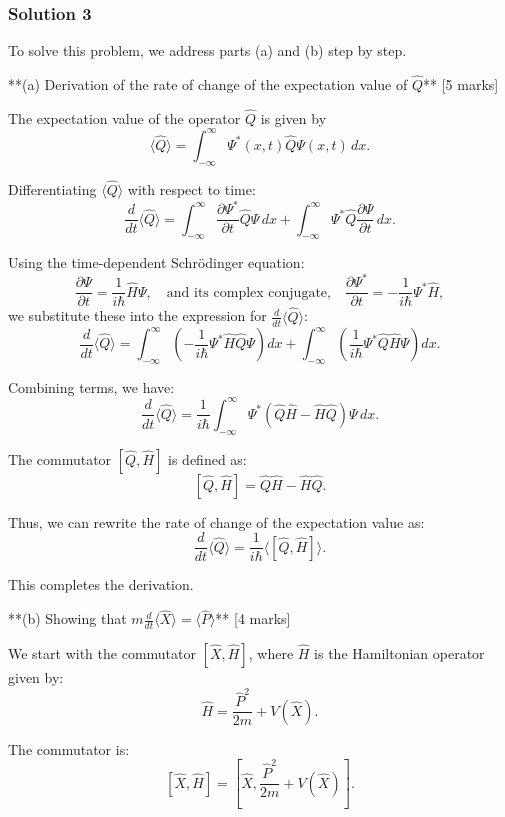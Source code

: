 \documentclass{article}
\begin{document}
\subsubsection{Solution 3}
To solve this problem, we address parts (a) and (b) step by step.

**(a) Derivation of the rate of change of the expectation value of $\hat{Q}$** [5 marks]  

The expectation value of the operator $\hat{Q}$ is given by  
\[
\langle \hat{Q} \rangle = \int_{-\infty}^\infty \Psi^*(x, t) \hat{Q} \Psi(x, t) \, dx.
\]  

Differentiating $\langle \hat{Q} \rangle$ with respect to time:
\[
\frac{d}{dt} \langle \hat{Q} \rangle = \int_{-\infty}^\infty \frac{\partial \Psi^*}{\partial t} \hat{Q} \Psi \, dx + \int_{-\infty}^\infty \Psi^* \hat{Q} \frac{\partial \Psi}{\partial t} \, dx.
\]  

Using the time-dependent Schrödinger equation:
\[
\frac{\partial \Psi}{\partial t} = \frac{1}{i\hbar} \hat{H} \Psi, \quad \text{and its complex conjugate,} \quad \frac{\partial \Psi^*}{\partial t} = -\frac{1}{i\hbar} \Psi^* \hat{H},
\]
we substitute these into the expression for $\frac{d}{dt} \langle \hat{Q} \rangle$:  
\[
\frac{d}{dt} \langle \hat{Q} \rangle = \int_{-\infty}^\infty \left(-\frac{1}{i\hbar} \Psi^* \hat{H} \hat{Q} \Psi \right) dx + \int_{-\infty}^\infty \left(\frac{1}{i\hbar} \Psi^* \hat{Q} \hat{H} \Psi \right) dx.
\]  

Combining terms, we have:
\[
\frac{d}{dt} \langle \hat{Q} \rangle = \frac{1}{i\hbar} \int_{-\infty}^\infty \Psi^* \left(\hat{Q} \hat{H} - \hat{H} \hat{Q} \right) \Psi \, dx.
\]  

The commutator $[\hat{Q}, \hat{H}]$ is defined as:
\[
[\hat{Q}, \hat{H}] = \hat{Q} \hat{H} - \hat{H} \hat{Q}.
\]

Thus, we can rewrite the rate of change of the expectation value as:
\[
\frac{d}{dt} \langle \hat{Q} \rangle = \frac{1}{i\hbar} \langle [\hat{Q}, \hat{H}] \rangle.
\]  

This completes the derivation.  

**(b) Showing that $m \frac{d}{dt} \langle \hat{X} \rangle = \langle \hat{P} \rangle$** [4 marks]  

We start with the commutator $[\hat{X}, \hat{H}]$, where $\hat{H}$ is the Hamiltonian operator given by:
\[
\hat{H} = \frac{\hat{P}^2}{2m} + V(\hat{X}).
\]

The commutator is:
\[
[\hat{X}, \hat{H}] = \left[\hat{X}, \frac{\hat{P}^2}{2m} + V(\hat{X})\right].
\]
\end{document}
